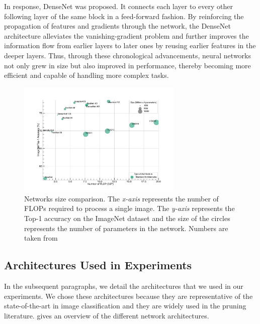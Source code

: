 In response, DenseNet \cite{huang2017densely} was proposed. It connects each
layer to every other following layer of the same block in a feed-forward
fashion. By reinforcing the propagation of features and gradients through the
network, the DenseNet architecture alleviates the vanishing-gradient problem and
further improves the information flow from earlier layers to later ones by
reusing earlier features in the deeper layers. Thus, through these chronological
advancements, neural networks not only grew in size but also improved in
performance, thereby becoming more efficient and capable of handling more
complex tasks.\\

\begin{figure}[htbp]
  \centering
  \includegraphics[width=0.7\textwidth]{chapter_sota/assets/network_sizes_normal.pdf}
  \caption{Networks size comparison. The \emph{x-axis} represents the number of
    \acp{FLOP} required to process a single image. The \emph{y-axis} represents
    the Top-1 accuracy on the ImageNet \cite{deng2009imagenet} dataset and the
    size of the circles represents the number of parameters in the network.
    Numbers are taken from \cite{pytorch_vision}}
  \label{fig:dlo:net_sizes}
\end{figure}

\subsection{Architectures Used in Experiments}\label{sec:dlo:architectures_used}

In the subsequent paragraphs, we detail the architectures that we used in our
experiments. We chose these architectures because they are representative of the
state-of-the-art in image classification and they are widely used in the pruning
literature.  gives an overview of the different
network architectures.\\


